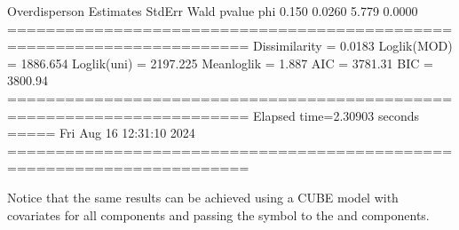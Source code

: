 \documentclass[letterpaper,10pt,english]{sphinxmanual}
\begin{document}
\begin{sphinxVerbatim}[commandchars=\\\{\}]
Overdisperson
          Estimates  StdErr    Wald  p\PYGZhy{}value
phi           0.150  0.0260   5.779   0.0000
=======================================================================
Dissimilarity = 0.0183
Loglik(MOD)   = \PYGZhy{}1886.654
Loglik(uni)   = \PYGZhy{}2197.225
Mean\PYGZhy{}loglik   = \PYGZhy{}1.887
\PYGZhy{}\PYGZhy{}\PYGZhy{}\PYGZhy{}\PYGZhy{}\PYGZhy{}\PYGZhy{}\PYGZhy{}\PYGZhy{}\PYGZhy{}\PYGZhy{}\PYGZhy{}\PYGZhy{}\PYGZhy{}\PYGZhy{}\PYGZhy{}\PYGZhy{}\PYGZhy{}\PYGZhy{}\PYGZhy{}\PYGZhy{}\PYGZhy{}\PYGZhy{}\PYGZhy{}\PYGZhy{}\PYGZhy{}\PYGZhy{}\PYGZhy{}\PYGZhy{}\PYGZhy{}\PYGZhy{}\PYGZhy{}\PYGZhy{}\PYGZhy{}\PYGZhy{}\PYGZhy{}\PYGZhy{}\PYGZhy{}\PYGZhy{}\PYGZhy{}\PYGZhy{}\PYGZhy{}\PYGZhy{}\PYGZhy{}\PYGZhy{}\PYGZhy{}\PYGZhy{}\PYGZhy{}\PYGZhy{}\PYGZhy{}\PYGZhy{}\PYGZhy{}\PYGZhy{}\PYGZhy{}\PYGZhy{}\PYGZhy{}\PYGZhy{}\PYGZhy{}\PYGZhy{}\PYGZhy{}\PYGZhy{}\PYGZhy{}\PYGZhy{}\PYGZhy{}\PYGZhy{}\PYGZhy{}\PYGZhy{}\PYGZhy{}\PYGZhy{}\PYGZhy{}\PYGZhy{}
AIC = 3781.31
BIC = 3800.94
=======================================================================
Elapsed time=2.30903 seconds =====\PYGZgt{}\PYGZgt{}\PYGZgt{} Fri Aug 16 12:31:10 2024
=======================================================================
\end{sphinxVerbatim}

\noindent{}

\sphinxAtStartPar
Notice that the same results can be achieved using a CUBE
model with covariates for all components and passing
the symbol  to the  and 
components.
\def\sphinxLiteralBlockLabel{\label{\detokenize{manual:id292}}}
\begin{sphinxVerbatim}[commandchars=\\\{\},numbers=left,firstnumber=1,stepnumber=1]
  
\end{sphinxVerbatim}
\end{document}
